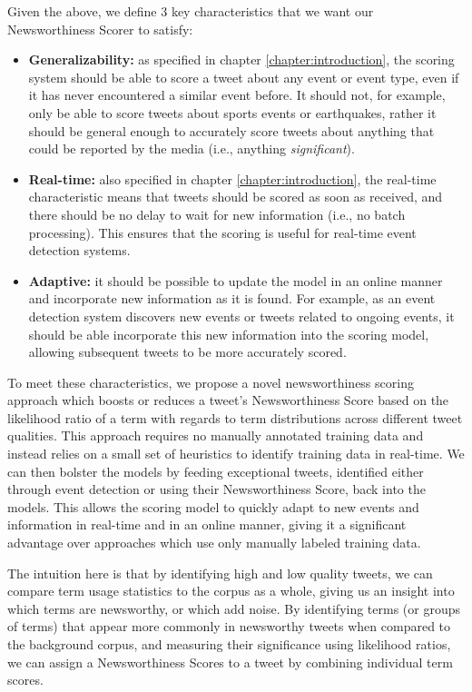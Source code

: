 Given the above, we define 3 key characteristics that we want our Newsworthiness Scorer to satisfy:
\begin{itemize}
	\item \textbf{Generalizability:} as specified in chapter \ref{chapter:introduction}, the scoring system should be able to score a tweet about any event or event type, even if it has never encountered a similar event before. It should not, for example, only be able to score tweets about sports events or earthquakes, rather it should be general enough to accurately score tweets about anything that could be reported by the media (i.e., anything \emph{significant}).
	\item \textbf{Real-time:} also specified in chapter \ref{chapter:introduction}, the real-time characteristic means that tweets should be scored as soon as received, and there should be no delay to wait for new information (i.e., no batch processing). This ensures that the scoring is useful for real-time event detection systems.
	\item \textbf{Adaptive:} it should be possible to update the model in an online manner and incorporate new information as it is found. For example, as an event detection system discovers new events or tweets related to ongoing events, it should be able incorporate this new information into the scoring model, allowing subsequent tweets to be more accurately scored.
\end{itemize}

To meet these characteristics, we propose a novel newsworthiness scoring approach which boosts or reduces a tweet's Newsworthiness Score based on the likelihood ratio of a term with regards to term distributions across different tweet qualities.
This approach requires no manually annotated training data and instead relies on a small set of heuristics to identify training data in real-time. We can then bolster the models by feeding exceptional tweets, identified either through event detection or using their Newsworthiness Score, back into the models.
This allows the scoring model to quickly adapt to new events and information in real-time and in an online manner, giving it a significant advantage over approaches which use only manually labeled training data.

The intuition here is that by identifying high and low quality tweets, we can compare term usage statistics to the corpus as a whole, giving us an insight into which terms are newsworthy, or which add noise.
By identifying terms (or groups of terms) that appear more commonly in newsworthy tweets when compared to the background corpus, and measuring their significance using likelihood ratios, we can assign a Newsworthiness Scores to a tweet by combining individual term scores.

